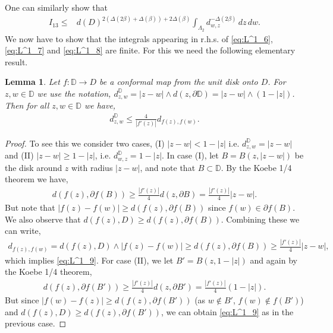\documentclass[a4paper, 11pt, reqno]{amsart}
\theoremstyle{definition} \newtheorem{defn}{Definition}[section]
\theoremstyle{remark} \newtheorem{rem}[defn]{Remark}
\theoremstyle{remark} \newtheorem*{rem*}{Remark}
\theoremstyle{plain} \newtheorem{thm}[defn]{Theorem}
\theoremstyle{plain} \newtheorem{lem}[defn]{Lemma}
\theoremstyle{plain} \newtheorem{prop}[defn]{Proposition}
\theoremstyle{plain} \newtheorem{cor}[defn]{Corollary}
\theoremstyle{remark} \newtheorem{exm}[defn]{\textbf{Example}}
\theoremstyle{remark} \newtheorem{exms}[defn]{\textbf{Examples}}
\theoremstyle{remark} \newtheorem*{bl}{}
\numberwithin{equation}{section} %
\newcommand{\D}{\mathbb{D}}
\begin{document}
		One can similarly show that 
		\begin{align}\label{eq:L^1_8}
			I_{13}  
			\le  & d(D)^{2(\Delta(2\beta) + \Delta(\beta)) + 2\Delta(\beta)}  \int_{\Lambda_2} d_{w,z}^{-\Delta(2\beta)} \, dz \,  dw.   
		\end{align}
        We now have to show that the integrals appearing in r.h.s. of \eqref{eq:L^1_6}, \eqref{eq:L^1_7} and \eqref{eq:L^1_8} are finite. For this we need the following elementary result.
        
		\begin{lem}
		Let $f : \D \to D$ be a conformal map from the unit disk onto $D$. For $z,w \in \D$ we use the notation, $d^{\D}_{z,w} = |z-w| \wedge d(z, \partial \D) = |z-w| \wedge (1-|z|)$. Then for all $z, w \in \D$ we have,
		\begin{align}\label{eq:L^1_9}
			d^{\D}_{z, w} \le \frac{4}{|f'(z)|} d_{f(z), f(w)}.
		\end{align}       
        \end{lem}
        
        \begin{proof}
		To see this we consider two cases, (I) $|z-w| < 1-|z|$ i.e. $d^{\D}_{z,w} = |z-w|$ and (II) $|z-w| \ge 1-|z|$, i.e. $d^{\D}_{w,z} =1-|z|$. In case (I), let $B = B(z, |z-w|)$ be the disk around $z$ with radius $|z-w|$, and note that $B \subset \D$. By the Koebe 1/4 theorem we have,
		\begin{align}
			d(f(z), \partial f(B)) \ge \frac{|f'(z)|}{4} d(z, \partial B) = \frac{|f'(z)|}{4} |z-w|.
		\end{align} 
		But note that $|f(z) - f(w)| \ge d(f(z), \partial f(B))$ since $f(w) \in \partial f(B)$. We also observe that $d(f(z), D) \ge d(f(z), \partial f(B))$. Combining these we can write,
		\begin{align}
			d_{f(z), f(w)} = d(f(z), D) \wedge |f(z)-f(w)| \ge d(f(z), \partial f(B)) \ge \frac{|f'(z)|}{4} |z-w|,
		\end{align}
		which implies \eqref{eq:L^1_9}. For case (II), we let $B' = B(z, 1-|z|)$ and again by the Koebe 1/4 theorem,
		\begin{align}
			d(f(z), \partial f(B')) \ge \frac{|f'(z)|}{4}  d(z, \partial B') = \frac{|f'(z)|}{4}  (1-|z|).
		\end{align} 
		But since $|f(w)- f(z)| \ge d(f(z), \partial f(B'))$  (as $w\notin B'$, $f(w) \notin f(B')$) and $d(f(z), D) \ge d(f(z), \partial f(B'))$, we can obtain \eqref{eq:L^1_9} as in the previous case.
        \end{proof}
        
\end{document}
